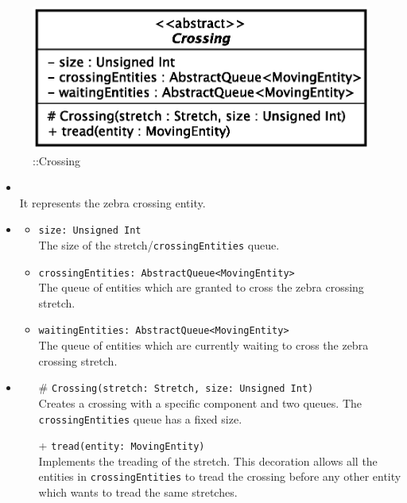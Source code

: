 \begin{figure}[h]
\centering
\includegraphics[scale=0.6,keepaspectratio]{images/solution/crossing.eps}
\caption{\pReactiveComponentStretchDecoration::Crossing}
\label{fig:sd-app-crossing}
\end{figure}
\FloatBarrier
\begin{itemize}
  \item \textbf{\descr} \\
    It represents the zebra crossing entity. 
  \item \textbf{\attrs}
  \begin{itemize}
    \item \texttt{size: Unsigned Int} \\
The size of the stretch/\texttt{crossingEntities} queue.
    \item \texttt{crossingEntities: AbstractQueue<MovingEntity>} \\
The queue of entities which are granted to cross the zebra crossing stretch.
  \item \texttt{waitingEntities: AbstractQueue<MovingEntity>} \\
The queue of entities which are currently waiting to cross the zebra crossing stretch.
  \end{itemize}
\item \textbf{\ops}
  \begin{itemize}
    \item[\#] \texttt{Crossing(stretch: Stretch, size: Unsigned Int)} \\
Creates a crossing with a specific component and two queues. The
\texttt{crossingEntities} queue has a fixed size.
    \item[+] \texttt{tread(entity: MovingEntity)} \\
Implements the treading of the stretch. This decoration allows all the
entities in \texttt{crossingEntities} to tread the crossing before any other entity
which wants to tread the same stretches.
  \end{itemize}
\end{itemize}
